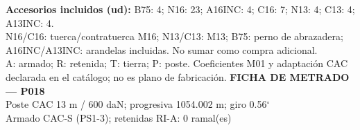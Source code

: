 \begingroup\scriptsize
\textbf{Accesorios incluidos (ud):} B75: 4; N16: 23; A16INC: 4; C16: 7; N13: 4; C13: 4; A13INC: 4.\\
N16/C16: tuerca/contratuerca M16; N13/C13: M13; B75: perno de abrazadera; A16INC/A13INC: arandelas incluidas. No sumar como compra adicional.\\
A: armado; R: retenida; T: tierra; P: poste. Coeficientes M01 y adaptación CAC declarada en el catálogo; no es plano de fabricación.
\endgroup\endgroup
\clearpage{}
\begingroup\small\setlength{\parskip}{3pt}\renewcommand{\arraystretch}{1.05}
\textbf{\large FICHA DE METRADO — P018}\\[4pt]
Poste CAC 13 m / 600 daN; progresiva 1054.002 m; giro 0.56\ensuremath{^\circ}\\
Armado CAC-S (PS1-3); retenidas RI-A: 0 ramal(es)\\
\begingroup\scriptsize
